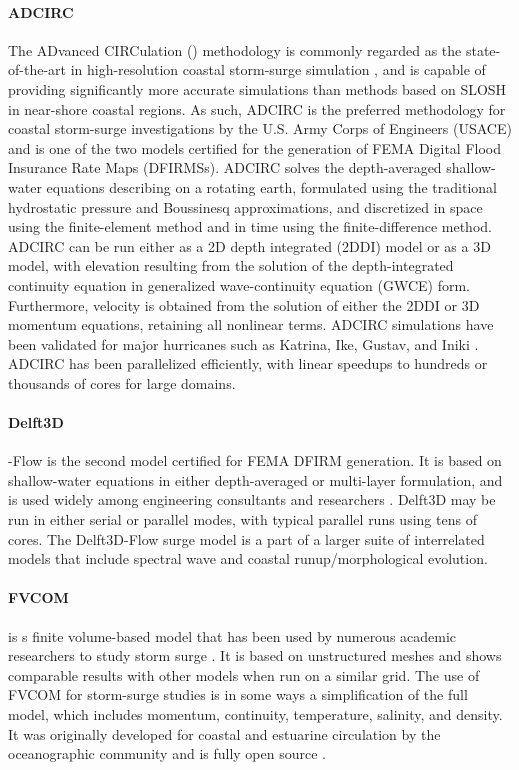 \paragraph{ADCIRC} The ADvanced CIRCulation () methodology is commonly regarded as the state-of-the-art in high-resolution coastal storm-surge simulation \citep{luettich1992adcirc}, and is capable of providing significantly more accurate simulations than methods based on SLOSH \citep{resio2008modeling} in near-shore coastal regions. As such, ADCIRC is the preferred methodology for coastal storm-surge investigations by the U.S. Army Corps of Engineers (USACE) and is one of the two models certified for the generation of FEMA Digital Flood Insurance Rate Maps (DFIRMSs). ADCIRC solves the depth-averaged shallow-water equations describing on a rotating earth, formulated using the traditional hydrostatic pressure and Boussinesq approximations, and discretized in space using the finite-element method and in time using the finite-difference method. ADCIRC can be run either as a 2D depth integrated (2DDI) model or as a 3D model, with elevation resulting from the solution of the depth-integrated continuity equation in generalized wave-continuity equation (GWCE) form. Furthermore, velocity is obtained from the solution of either the 2DDI or 3D momentum equations, retaining all nonlinear terms. ADCIRC simulations have been validated for major hurricanes such as Katrina, Ike, Gustav, and Iniki \citep{kennedy2011origin,kennedy2012tropical}. ADCIRC has been parallelized efficiently, with linear speedups to hundreds or thousands of cores for large domains. 

\paragraph{Delft3D} -Flow is the second model certified for FEMA DFIRM generation. It is based on shallow-water equations in either depth-averaged or multi-layer formulation, and is used widely among engineering consultants and researchers \citep{hu2015numerical,vousdoukas2016projections}. Delft3D may be run in either serial or parallel modes, with typical parallel runs using tens of cores. The Delft3D-Flow surge model is a part of a larger suite of interrelated models that include spectral wave and coastal runup/morphological evolution. 

\paragraph{FVCOM}  is s finite volume-based model that has been used by numerous academic researchers to study storm surge \citep{kerr2013ioos,rego2010storm}. It is based on unstructured meshes and shows comparable results with other models when run on a similar grid. The use of FVCOM for storm-surge studies is in some ways a simplification of the full model, which includes momentum, continuity, temperature, salinity, and density. It was originally developed for coastal and estuarine circulation by the oceanographic community and is fully open source \citep{chen2003unstructured}. 

